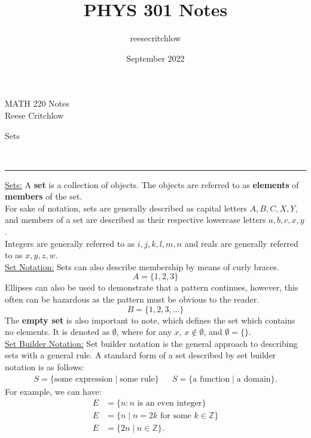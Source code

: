 \documentclass{article}
\title{PHYS 301 Notes}
\author{reesecritchlow }
\date{September 2022}
\newcommand{\header}[1]{\begin{large}\noindent #1\end{large}\\\rule{\textwidth}{0.5pt}}
\newcommand{\sheader}[1]{\underline{#1:}}
\newcommand{\sgap}{\smallskip\\}
\begin{document}
\begin{center}
    \Large MATH 220 Notes\\
    \normalsize Reese Critchlow
\end{center}

\header{Sets}

\sheader{Sets} A \textbf{set} is a collection of objects. The objects are referred to 
as \textbf{elements} of \textbf{members} of the set.
\sgap
For sake of notation, sets are generally described as capital letters $A, B, C, X, Y$, and
members of a set are described as their respective lowercase letters $a,b,c,x,y$.
\sgap
Integers are generally referred to as $i,j,k,l,m,n$ and reals are generally referred to 
as $x,y,z,w$.
\sgap
\sheader{Set Notation} Sets can also describe membership by means of curly braces. 
\[
    A = \{1, 2, 3\}    
\]
Ellipses can also be used to demonstrate that a pattern continues, however, this often
can be hazardous as the pattern must be obvious to the reader.
\[
    B = \{1, 2, 3, \ldots\}    
\]
The \textbf{empty set} is also important to note, which defines the set which contains
no elements. It is denoted as $\emptyset$, where for any $x$, $x \notin \emptyset$, and $\emptyset = \{\}$.
\sgap
\sheader{Set Builder Notation} Set builder notation is the general approach to describing sets
with a general rule. A standard form of a set described by set builder notation is as follows:
\begin{align*}
    S = \{\textrm{some expression} \mid \textrm{some rule}\} && S = \{\textrm{a function} \mid \textrm{a domain}\}.
\end{align*}
For example, we can have: 
\begin{align*}
    E &= \{n : n \textrm{ is an even integer}\}\\
    E &= \{n \mid n = 2k \textrm{ for some } k \in \mathbb{Z}\}\\
    E &= \{2n \mid n \in \mathbb{Z}\}.
\end{align*}
\end{document}
